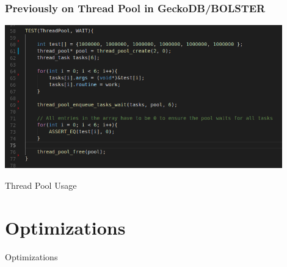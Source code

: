 \documentclass{beamer}
\begin{document}
\begin{frame}
	\frametitle{Previously on Thread Pool in GeckoDB/BOLSTER}
	\begin{center}
		\includegraphics[width=0.9\textwidth]{img/thread_pool_use.png}
		
	\end{center}
	\begin{center}
		Thread Pool Usage
	\end{center}
\end{frame}

\section{Optimizations}
\begin{frame}
\begin{center}
	\huge Optimizations
\end{center}
\end{frame}
\end{document}
